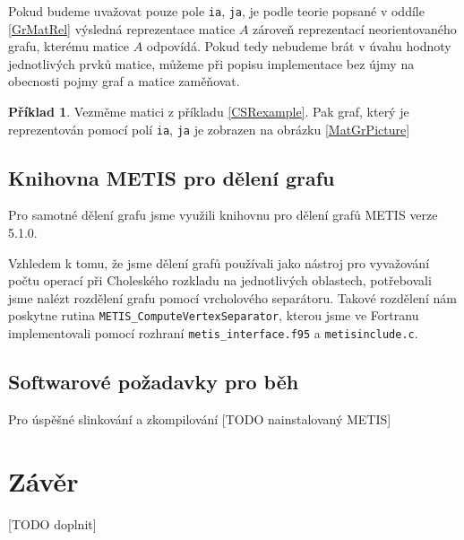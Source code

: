 \documentclass[11pt,american,czech,oneside]{book}
\theoremstyle{plain}
\theoremstyle{definition}
\newtheorem{example}{Příklad}
\begin{document}
Pokud budeme uvažovat pouze pole \texttt{ia}, \texttt{ja}, je podle teorie popsané v oddíle \ref{GrMatRel} výsledná reprezentace matice $A$ zároveň reprezentací neorientovaného grafu, kterému matice $A$ odpovídá. Pokud tedy nebudeme brát v úvahu hodnoty jednotlivých prvků matice, můžeme při popisu implementace bez újmy na obecnosti pojmy graf a matice zaměňovat.

\begin{example}
  Vezměme matici z příkladu \ref{CSRexample}. Pak graf, který je reprezentován pomocí polí \texttt{ia}, \texttt{ja} je zobrazen na obrázku \ref{MatGrPicture}
\end{example}

\section{Knihovna METIS pro dělení grafu}

Pro samotné dělení grafu jsme využili knihovnu pro dělení grafů METIS \cite{kary:13} verze 5.1.0.

Vzhledem k tomu, že jsme dělení grafů používali jako nástroj pro vyvažování počtu operací při Choleského rozkladu na jednotlivých oblastech, potřebovali jsme nalézt rozdělení grafu pomocí vrcholového separátoru. Takové rozdělení nám poskytne rutina \texttt{METIS\_ComputeVertexSeparator}, kterou jsme ve Fortranu implementovali pomocí rozhraní \texttt{metis\_interface.f95} a \texttt{metisinclude.c}. 

\section{Softwarové požadavky pro běh}
Pro úspěšné slinkování a zkompilování
[TODO nainstalovaný METIS]







\chapter*{Závěr}
[TODO doplnit]


\newpage


\end{document}
